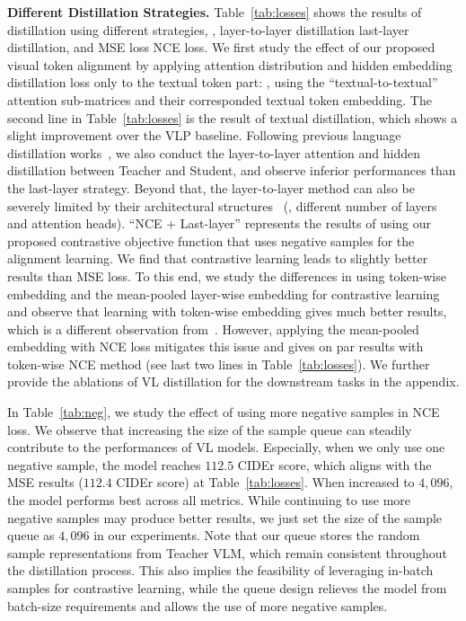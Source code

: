 \noindent \textbf{Different Distillation Strategies.} 
\label{sec:method}
Table~\ref{tab:losses} shows the results of distillation using different strategies, \ie, layer-to-layer distillation \vs last-layer distillation, and MSE loss \vs NCE loss. We first study the effect of our proposed visual token alignment by applying attention distribution and hidden embedding distillation loss only to the textual token part: \eg, using the ``textual-to-textual'' attention sub-matrices and their corresponded textual token embedding. The second line in Table~\ref{tab:losses} is the result of textual distillation, which shows a slight improvement over the VLP baseline. 
Following previous language distillation works~\cite{jiao2019tinybert}, we also conduct the layer-to-layer attention and hidden distillation between Teacher and Student, and observe inferior performances than the last-layer strategy. Beyond that, the layer-to-layer method can also be severely limited by their architectural structures~\cite{wang2020minilm} (\eg, different number of layers and attention heads). ``NCE + Last-layer'' represents the results of \distillvlm using our proposed contrastive objective function that uses negative samples for the alignment learning. We find that contrastive learning leads to slightly better results than MSE loss. To this end, we study the differences in using token-wise embedding and the mean-pooled layer-wise embedding for contrastive learning and observe that learning with token-wise embedding gives much better results, which is a different observation from~\cite{sun2020contrastive}. However, applying the mean-pooled embedding with NCE loss mitigates this issue and gives on par results with token-wise NCE method (see last two lines in Table~\ref{tab:losses}).
We further provide the ablations of VL distillation for the downstream tasks in the appendix. 

In Table~\ref{tab:neg}, we study the effect of using more negative samples in NCE loss. We observe that increasing the size of the sample queue can steadily contribute to the performances of VL models. Especially, when we only use one negative sample, the model reaches $112.5$ CIDEr score, which aligns with the MSE results ($112.4$ CIDEr score) at Table~\ref{tab:losses}. When increased to $4,096$, the model performs best across all metrics. While continuing to use more negative samples may produce better results, we just set the size of the sample queue as $4,096$ in our experiments. Note that our queue stores the random sample representations from Teacher VLM, which remain consistent throughout the distillation process.
This also implies the feasibility of leveraging in-batch samples for contrastive learning, while the queue design relieves the model from batch-size requirements and allows the use of more negative samples.



